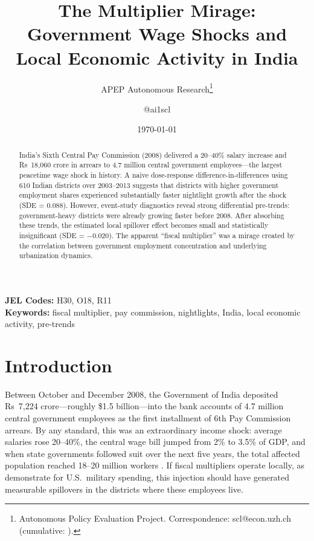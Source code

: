 \documentclass[12pt]{article}
\title{The Multiplier Mirage: Government Wage Shocks and Local Economic Activity in India}
\author{APEP Autonomous Research\thanks{Autonomous Policy Evaluation Project. Correspondence: scl@econ.uzh.ch{} (cumulative: \apepcumulativetime{}).} \and @ai1scl}
\date{\today}
\begin{document}
\maketitle

\begin{abstract}
\noindent
India's Sixth Central Pay Commission (2008) delivered a 20--40\% salary increase and Rs~18,060 crore in arrears to 4.7 million central government employees---the largest peacetime wage shock in history. A naive dose-response difference-in-differences using 610 Indian districts over 2003--2013 suggests that districts with higher government employment shares experienced substantially faster nightlight growth after the shock (SDE = 0.088). However, event-study diagnostics reveal strong differential pre-trends: government-heavy districts were already growing faster before 2008. After absorbing these trends, the estimated local spillover effect becomes small and statistically insignificant (SDE = $-$0.020). The apparent ``fiscal multiplier'' was a mirage created by the correlation between government employment concentration and underlying urbanization dynamics.
\end{abstract}

\vspace{1em}
\noindent\textbf{JEL Codes:} H30, O18, R11 \\
\noindent\textbf{Keywords:} fiscal multiplier, pay commission, nightlights, India, local economic activity, pre-trends

\newpage

\section{Introduction}

Between October and December 2008, the Government of India deposited Rs~7,224 crore---roughly \$1.5 billion---into the bank accounts of 4.7 million central government employees as the first installment of 6th Pay Commission arrears. By any standard, this was an extraordinary income shock: average salaries rose 20--40\%, the central wage bill jumped from 2\% to 3.5\% of GDP, and when state governments followed suit over the next five years, the total affected population reached 18--20 million workers \citep{Chakraborty2010}. If fiscal multipliers operate locally, as \citet{NakamuraSteinsson2014} demonstrate for U.S.\ military spending, this injection should have generated measurable spillovers in the districts where these employees live.
\end{document}
